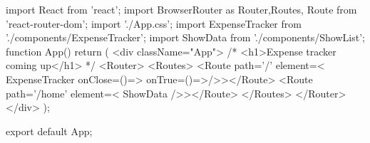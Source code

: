 import React from 'react';
import { BrowserRouter as Router,Routes, Route } from 'react-router-dom';
import './App.css';
import ExpenseTracker from './components/ExpenseTracker';
import ShowData from './components/ShowList';
function App() {
  return (
    <div className="App">
     {/* <h1>Expense tracker coming up</h1> */}
     <Router>
           <Routes>
                 <Route path='/' element={< ExpenseTracker onClose={()=>{}} onTrue={()=>{}}/>}></Route>
                 <Route path='/home' element={< ShowData />}></Route>
          </Routes>
      </Router>
    </div>
  );
}

export default App;